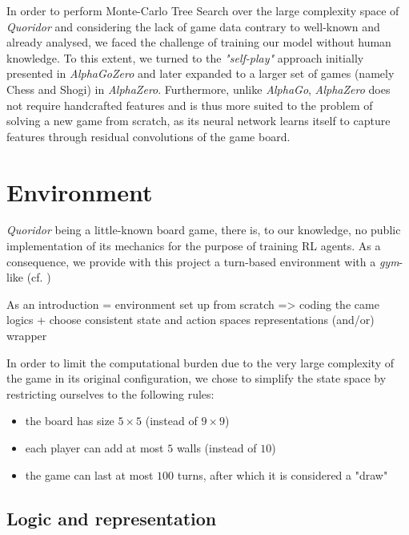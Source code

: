 \documentclass[journal, a4paper]{IEEEtran}
\begin{document}
In order to perform Monte-Carlo Tree Search over the large complexity space of \textit{Quoridor} and considering the lack of game data contrary to well-known and already analysed, we faced the challenge of training our model without human knowledge. To this extent, we turned to the \textit{"self-play"} approach initially presented in  \textit{AlphaGoZero}\cite{alphagozero} and later expanded to a larger set of games (namely Chess and Shogi) in \textit{AlphaZero}\cite{alphazero}. Furthermore, unlike \textit{AlphaGo}, \textit{AlphaZero} does not require handcrafted features and is thus more suited to the problem of solving a new game from scratch, as its neural network learns itself to capture features through residual convolutions of the game board. 

\section{Environment}
\label{sec:environment}

 \textit{Quoridor} being a little-known board game, there is, to our knowledge, no public implementation of its mechanics for the purpose of training RL agents. As a consequence, we provide with this project a turn-based environment with a \textit{gym}-like (cf. \cite{openai-gym})

As an introduction = environment set up from scratch => coding the came logics + choose consistent state and action spaces representations (and/or) wrapper

In order to limit the computational burden due to the very large complexity of the game in its original configuration, we chose to simplify the state space by restricting ourselves to the following rules:
\begin{itemize}
    \item the board has size $5\times 5$ (instead of $9\times 9$)
    \item each player can add at most $5$ walls (instead of $10$)
    \item the game can last at most $100$ turns, after which it is considered a "draw"
\end{itemize}

\subsection{Logic and representation}
\label{ssec:game-logic}
\end{document}
